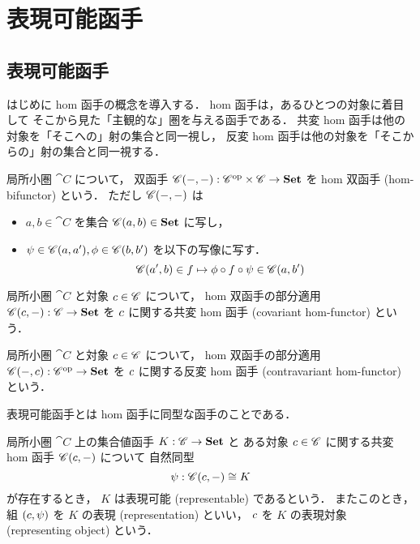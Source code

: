 \documentclass[titlepage]{ltjsreport}
\newtheorem[S]{theorem}{定理}[chapter]
\newtheorem[S]{definition}[theorem]{定義}
\newtheorem[S]{example}[theorem]{例}
\begin{document}
\chapter{表現可能函手}

\section{表現可能函手}

はじめに hom 函手の概念を導入する．
hom 函手は，あるひとつの対象に着目して
そこから見た「主観的な」圏を与える函手である．
共変 hom 函手は他の対象を「そこへの」射の集合と同一視し，
反変 hom 函手は他の対象を「そこからの」射の集合と同一視する．
\begin{definition}
  \def\C{\cat{C}}%
  局所小圏 $\C$ について，
  双函手 $\mrp{\C(-,-)}{\op{\C}\times\C}{\set}$
  を hom 双函手 (hom-bifunctor) という．
  ただし $\mrps{\C}{-}{-}$ は
  \begin{itemize}
    \item $a,b\in\C$ を集合 $\mrps{\C}{a}{b}\in\set$ に写し，
    \item $\psi\in\mrps{\C}{a}{a'},\phi\in\mrps{\C}{b}{b'}$
          を以下の写像に写す．
          \begin{equation}
            \mrps{\C}{a'}{b}\in f\mapsto\phi\circ f\circ\psi\in\mrps{\C}{a}{b'}
          \end{equation}
  \end{itemize}
\end{definition}
\begin{definition}[共変 hom 函手]
  \def\C{\cat{C}}%
  \def\c{\obj{c}}%
  局所小圏 $\C$ と対象 $\c\in\objs{\C}$ について，
  hom 双函手の部分適用 $\mrp{\mrps{\C}{\c}{-}}{\C}{\set}$ を
  $\c$ に関する共変 hom 函手 (covariant hom-functor) という．
\end{definition}
\begin{definition}[反変 hom 函手]
  \def\C{\cat{C}}%
  \def\c{\obj{c}}%
  局所小圏 $\C$ と対象 $\c\in\objs{\C}$ について，
  hom 双函手の部分適用 $\mrp{\mrps{\C}{-}{\c}}{\op{\C}}{\set}$ を
  $\c$ に関する反変 hom 函手 (contravariant hom-functor) という．
\end{definition}
表現可能函手とは hom 函手に同型な函手のことである．

\begin{definition}[表現可能函手]
  \def\C{\cat{C}}%
  \def\c{\obj{c}}%
  \def\K{K}%
  局所小圏 $\C$ 上の集合値函手 $\mrp{\K}{\C}{\set}$ と
  ある対象 $\c\in\objs{\C}$ に関する共変 hom 函手 $\mrps{\C}{\c}{-}$ について
  自然同型
  \begin{equation}
    \psi:\mrps{\C}{\c}{-}\cong\K
  \end{equation}
  が存在するとき，
  $\K$ は表現可能 (representable) であるという．
  またこのとき，組 $(\c,\psi)$ を $\K$ の表現 (representation) といい，
  $\c$ を $\K$ の表現対象 (representing object) という．
\end{definition}
\end{document}
